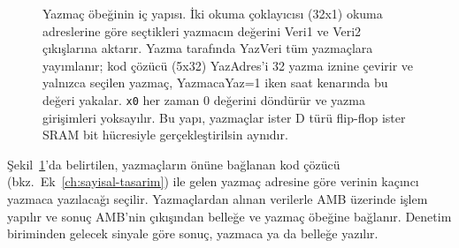 \begin{figure}[htbp]
\caption[Yazmaç öbeğinin iç yapısı]{Yazmaç öbeğinin iç yapısı. İki okuma çoklayıcısı (32x1) okuma adreslerine göre seçtikleri yazmacın değerini Veri1 ve Veri2 çıkışlarına aktarır. Yazma tarafında YazVeri tüm yazmaçlara yayımlanır; kod çözücü (5x32) YazAdres'i 32 yazma iznine çevirir ve yalnızca seçilen yazmaç, YazmacaYaz=1 iken saat kenarında bu değeri yakalar. \texttt{x0} her zaman 0 değerini döndürür ve yazma girişimleri yoksayılır. Bu yapı, yazmaçlar ister D türü flip-flop ister SRAM bit hücresiyle gerçekleştirilsin aynıdır.}
\label{fig:yazmac-obegi}
\end{figure}

Şekil~\ref{fig:yazmac-obegi}'da belirtilen, yazmaçların önüne bağlanan kod çözücü (bkz.\ Ek~\ref{ch:sayisal-tasarim}) ile gelen yazmaç adresine göre verinin kaçıncı yazmaca yazılacağı seçilir. Yazmaçlardan alınan verilerle AMB üzerinde işlem yapılır ve sonuç AMB'nin çıkışından belleğe ve yazmaç öbeğine bağlanır. Denetim biriminden gelecek sinyale göre sonuç, yazmaca ya da belleğe yazılır.

